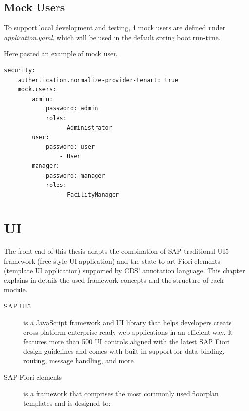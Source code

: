 \subsection{Mock Users}
To support local development and testing, 4 mock users are defined under \textit{application.yaml}, which will be used in the default spring boot run-time.

Here pasted an example of mock user.

\begin{lstlisting}[language={bash}]
security:
    authentication.normalize-provider-tenant: true
    mock.users:
        admin:
            password: admin
            roles:  
                - Administrator 
        user:
            password: user
                - User
        manager:
            password: manager
            roles:
                - FacilityManager
\end{lstlisting}

\section{UI}

The front-end of this thesis adapts the combination of SAP traditional UI5 framework (free-style UI application) and the state to art Fiori elements (template UI application) supported by CDS' annotation language. This chapter explains in details the used framework concepts and the structure of each module.

\begin{description}
	\item[SAP UI5] is a JavaScript framework and UI library that helps developers create cross-platform enterprise-ready web applications in an efficient way. It features more than 500 UI controls aligned with the latest SAP Fiori design guidelines and comes with built-in support for data binding, routing, message handling, and more. \cite{fiorielements}
 
	\item[SAP Fiori elements] is a framework that comprises the most commonly used floorplan templates and is designed to:
\end{description}

